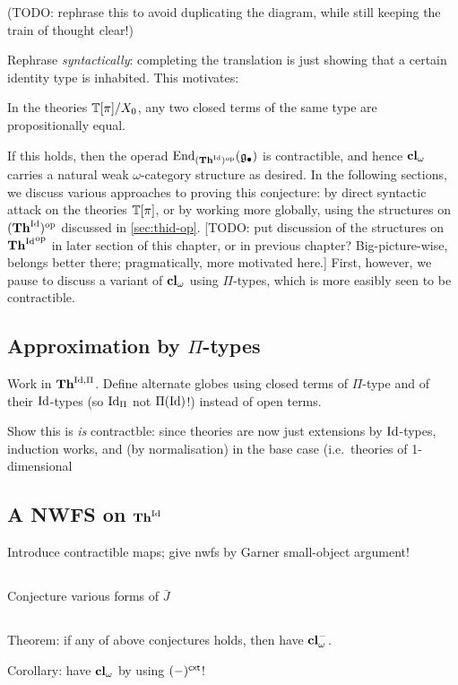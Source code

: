 (TODO: rephrase this to avoid duplicating the diagram, while still keeping the train of thought clear!)

Rephrase \emph{syntactically}: completing the translation is just showing that a certain identity type is inhabited.   This motivates:

\begin{conjecture}In the theories $\mathbb{T}[\pi]/X_0$, any two closed terms of the same type are propositionally equal.
\end{conjecture}

If this holds, then the operad $\mathrm{End}_{(\mathbf{Th}^{\mathrm{Id}})^{\mathrm{op}}}(\mathfrak{g}_\bullet)$ is contractible, and hence $\mathbf{cl}_\omega$ carries a natural weak $\omega$-category structure as desired.  In the following sections, we discuss various approaches to proving this conjecture: by direct syntactic attack on the theories $\mathbb{T}[\pi]$, or by working more globally, using the structures on $(\mathbf{Th}^{\mathrm{Id}})^{\mathrm{op}}$ discussed in \ref{sec:thid-op}.  [TODO: put discussion of the structures on ${\mathbf{Th}^{\mathrm{Id}}}^{\mathrm{op}}$ in later section of this chapter, or in previous chapter?  Big-picture-wise, belongs better there; pragmatically, more motivated here.]  First, however, we pause to discuss a variant of $\mathbf{cl}_\omega$ using $\Pi$-types, which is more easibly seen to be contractible.

\subsection*{Approximation by $\Pi$-types}

\para
Work in $\mathbf{Th}^{\mathrm{Id},\Pi}$.  Define alternate globes using closed terms of $\Pi$-type and of their $\mathrm{Id}$-types (so $\mathrm{Id}_\Pi$ not $\Pi (\mathrm{Id})$!) instead of open terms.

Show this is \emph{is} contractble: since theories are now just extensions by $\mathrm{Id}$-types, induction works, and (by normalisation) in the base case (i.e.\ theories of 1-dimensional




\subsection*{A NWFS on $\mathbf{Th}^{\mathrm{Id}}$} Introduce contractible maps; give nwfs by Garner small-object argument!

\subsection*{} Conjecture various forms of $\bar{J}$

\subsection*{} Theorem: if any of above conjectures holds, then have $\mathbf{cl}^-_\omega$.

\begin{para} Corollary: have $\mathbf{cl}_\omega$ by using $(-)^{\mathsf{cxt}}$!
\end{para}



